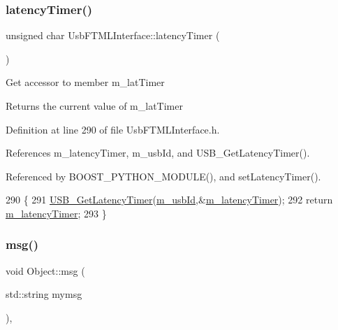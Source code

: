 \subsubsection{\texorpdfstring{latency\+Timer()}{latencyTimer()}}
{\footnotesize\ttfamily unsigned char Usb\+F\+T\+M\+L\+Interface\+::latency\+Timer (\begin{DoxyParamCaption}{ }\end{DoxyParamCaption})\hspace{0.3cm}{\ttfamily [inline]}}

Get accessor to member m\+\_\+lat\+Timer \begin{DoxyReturn}{Returns}
the current value of m\+\_\+lat\+Timer 
\end{DoxyReturn}


Definition at line 290 of file Usb\+F\+T\+M\+L\+Interface.\+h.



References m\+\_\+latency\+Timer, m\+\_\+usb\+Id, and U\+S\+B\+\_\+\+Get\+Latency\+Timer().



Referenced by B\+O\+O\+S\+T\+\_\+\+P\+Y\+T\+H\+O\+N\+\_\+\+M\+O\+D\+U\+L\+E(), and set\+Latency\+Timer().


\begin{DoxyCode}
290                                 \{
291     \hyperlink{LALUsbML_8h_a90c0ec96b211bb1b45c4b26afe6f6ced}{USB\_GetLatencyTimer}(\hyperlink{classUsbFTMLInterface_aab6754587c303660d5c498ce34a2b4c8}{m\_usbId},&\hyperlink{classUsbFTMLInterface_a28342ea2c00af670f1376aaa36ad0236}{m\_latencyTimer});
292     \textcolor{keywordflow}{return} \hyperlink{classUsbFTMLInterface_a28342ea2c00af670f1376aaa36ad0236}{m\_latencyTimer};
293   \}
\end{DoxyCode}
\mbox{\label{classObject_a58b2d0618c2d08cf2383012611528d97}} 
\subsubsection{\texorpdfstring{msg()}{msg()}\hspace{0.1cm}{\footnotesize\ttfamily [1/2]}}
{\footnotesize\ttfamily void Object\+::msg (\begin{DoxyParamCaption}\item[{std\+::string}]{mymsg }\end{DoxyParamCaption})\hspace{0.3cm}{\ttfamily [inline]}, {\ttfamily [inherited]}}



